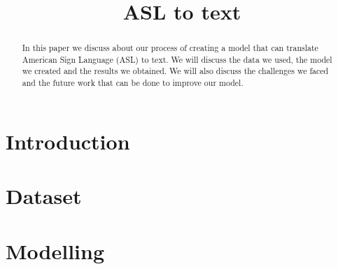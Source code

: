 \documentclass[conference]{IEEEtran}
\begin{document}
    \title{ASL to text\\}

    \author{
    \and
    \and
    }

    \maketitle

    \begin{abstract}
        In this paper we discuss about our process of creating a model that can translate American Sign Language (ASL) to text.
        We will discuss the data we used, the model we created and the results we obtained.
        We will also discuss the challenges we faced and the future work that can be done to improve our model.
    \end{abstract}


    \section{Introduction}\label{sec:introduction}
    

    \section{Dataset}\label{sec:dataset}
    

    \section{Modelling}\label{sec:modelling}
    
\end{document}
